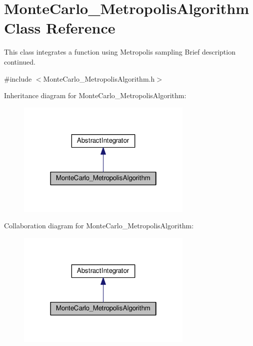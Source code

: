 \hypertarget{class_monte_carlo___metropolis_algorithm}{}\section{Monte\+Carlo\+\_\+\+Metropolis\+Algorithm Class Reference}
\label{class_monte_carlo___metropolis_algorithm}


This class integrates a function using Metropolis sampling Brief description continued.  




{\ttfamily \#include $<$Monte\+Carlo\+\_\+\+Metropolis\+Algorithm.\+h$>$}



Inheritance diagram for Monte\+Carlo\+\_\+\+Metropolis\+Algorithm\+:
\nopagebreak
\begin{figure}[H]
\begin{center}
\leavevmode
\includegraphics[width=238pt]{class_monte_carlo___metropolis_algorithm__inherit__graph}
\end{center}
\end{figure}


Collaboration diagram for Monte\+Carlo\+\_\+\+Metropolis\+Algorithm\+:
\nopagebreak
\begin{figure}[H]
\begin{center}
\leavevmode
\includegraphics[width=238pt]{class_monte_carlo___metropolis_algorithm__coll__graph}
\end{center}
\end{figure}
